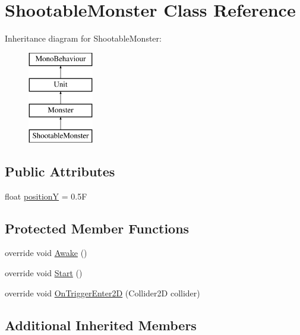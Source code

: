 \hypertarget{class_shootable_monster}{}\section{Shootable\+Monster Class Reference}
\label{class_shootable_monster}
Inheritance diagram for Shootable\+Monster\+:\begin{figure}[H]
\begin{center}
\leavevmode
\includegraphics[height=4.000000cm]{class_shootable_monster}
\end{center}
\end{figure}
\subsection*{Public Attributes}
\begin{DoxyCompactItemize}
\item 
float \mbox{\hyperlink{class_shootable_monster_a3dc33446a2d7405d4c0f49de76c4961d}{positionY}} = 0.\+5F
\end{DoxyCompactItemize}
\subsection*{Protected Member Functions}
\begin{DoxyCompactItemize}
\item 
override void \mbox{\hyperlink{class_shootable_monster_adfb9638b7a397563df4ab94c2db20ec0}{Awake}} ()
\item 
override void \mbox{\hyperlink{class_shootable_monster_a0e26de95298ec75a591ecede3c1d8cb9}{Start}} ()
\item 
override void \mbox{\hyperlink{class_shootable_monster_a6c350a976d1bb37db2c663834c90e83b}{On\+Trigger\+Enter2D}} (Collider2D collider)
\end{DoxyCompactItemize}
\subsection*{Additional Inherited Members}


